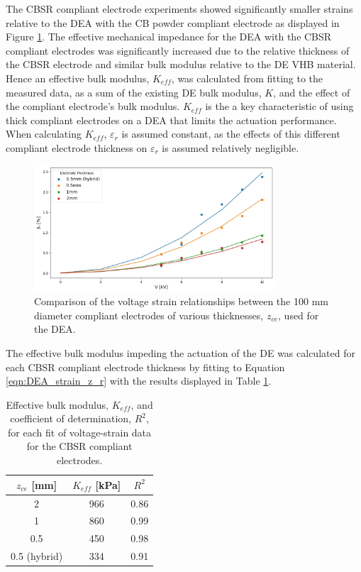The CBSR compliant electrode experiments showed significantly smaller strains relative to the DEA with the CB powder compliant electrode as displayed in Figure \ref{fig:DEA_CBSR_thickness_results}. The effective mechanical impedance for the DEA with the CBSR compliant electrodes was significantly increased due to the relative thickness of the CBSR electrode and similar bulk modulus relative to the DE VHB material. Hence an effective bulk modulus, $K_{e\!f\!f}$, was calculated from fitting to the measured data, as a sum of the existing DE bulk modulus, $K$, and the effect of the compliant electrode's bulk modulus. $K_{e\!f\!f}$ is the a key characteristic of using thick compliant electrodes on a DEA that limits the actuation performance. When calculating $K_{e\!f\!f}$, $\varepsilon_r$ is assumed constant, as the effects of this different compliant electrode thickness on $\varepsilon_r$ is assumed relatively negligible. %
\begin{figure}[H]
	\centering
	\includegraphics[width = 0.8\textwidth]{Figures/DEA_CBSR_thickness_strains_vs_fits_hyb.jpg}
	\vspace{0.2cm}
	\caption{Comparison of the voltage strain relationships between the 100 mm diameter compliant electrodes of various thicknesses, $z_{ce}$, used for the DEA.}
	\label{fig:DEA_CBSR_thickness_results}
\end{figure}
The effective bulk modulus impeding the actuation of the DE was calculated for each CBSR compliant electrode thickness by fitting to Equation \ref{eqn:DEA_strain_z_r} with the results displayed in Table \ref{tab:cbsr_bulk_mods}.
\begin{table}[h!]
	\begin{center}
		\caption{Effective bulk modulus, $K_{e\!f\!f}$,  and coefficient of determination, $R^2$, for each fit of voltage-strain data for the CBSR compliant electrodes.}
		\vspace{0.5cm}
		\label{tab:cbsr_bulk_mods}
		\begin{tabular}{c|c|c} %
			$z_{ce}$ [mm] & $K_{e\!f\!f}$ [kPa] & $R^2$ \\
			\hline
			2 & 966 & 0.86\\
			1 & 860 & 0.99\\
			0.5 & 450 & 0.98 \\
			0.5 (hybrid) & 334 & 0.91\\
		\end{tabular}
	\end{center}
\end{table}
